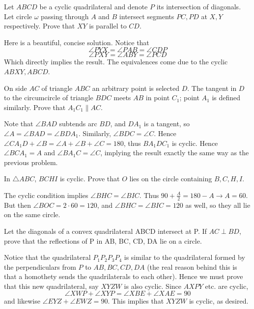 \documentclass[11pt]{scrartcl}
\begin{document}
\begin{example}
  Let $ABCD$ be a cyclic quadrilateral and denote $P$ its intersection of
  diagonals. Let circle $\omega$ passing through $A$ and $B$ intersect segments
  $PC, PD$ at $X,Y$ respectively. Prove that $XY$ is parallel to $CD$.
\end{example}
\begin{soln}
  Here is a beautiful, concise solution.
  \newline \newline
  Notice that
  $$\angle PYX=\angle PAB=\angle CDP$$
  $$\angle PXY=\angle ABY=\angle PCD$$
  Which directly implies the result. The equivalences come due to the cyclic
  $ABXY, ABCD$.
\end{soln}
\begin{example}
  [Shargyin 2012]
  On side $AC$ of triangle $ABC$ an arbitrary point is selected $D$. The tangent in $D$ to the circumcircle of triangle $BDC$ meets $AB$ in point $C_{1}$; point $A_{1}$ is defined similarly. Prove that $A_{1}C_{1}\parallel AC$.
\end{example}
\begin{soln}
  Note that $\angle BAD$ subtends arc $BD$, and $DA_1$ is a tangent,
  so $\angle A=\angle BAD=\angle BDA_1$. Similarly, $\angle BDC=\angle C$.
  Hence $\angle CA_1D+\angle B=\angle A+\angle B+\angle C=180$, thus
  $BA_1DC_1$ is cyclic. Hence $\angle BCA_1=A$ and $\angle BA_1C=\angle C$,
  implying the result exactly the same way as the previous problem.
\end{soln}
\begin{example}
  In $\triangle ABC$, $BCHI$ is cyclic. Prove that $O$ lies on the circle containing $B,C,H,I$.
\end{example}
\begin{soln}
  The cyclic condition implies $\angle BHC=\angle BIC$. Thus $90+\frac{A}{2}=180-A\to A=60$.
  But then $\angle BOC=2\cdot 60=120$, and $\angle BHC=\angle BIC=120$ as well, so they all lie on the same circle.
\end{soln}
\begin{example}
  [USAMO]
  Let the diagonals of a convex quadrilateral ABCD intersect
  at P. If $AC\perp BD$, prove that the reflections of P in AB, BC, CD, DA lie on a
  circle.
\end{example}
\begin{soln}
  Notice that the quadrilateral $P_1P_2P_3P_4$ is similar to the quadrilateral formed by the perpendiculars from $P$ to
  $AB,BC,CD,DA$ (the real reason behind this is that a homothety sends the quadrilaterals to each other).
  Hence we must prove that this new quadrilateral, say $XYZW$ is also cyclic.
  Since $AXPY$ etc. are cyclic,
  $$\angle XWP+\angle XYP=\angle XBE+\angle XAE=90$$
  and likewise $\angle EYZ+\angle EWZ=90$. This implies that $XYZW$ is cyclic,
  as desired.
\end{soln}
\end{document}
